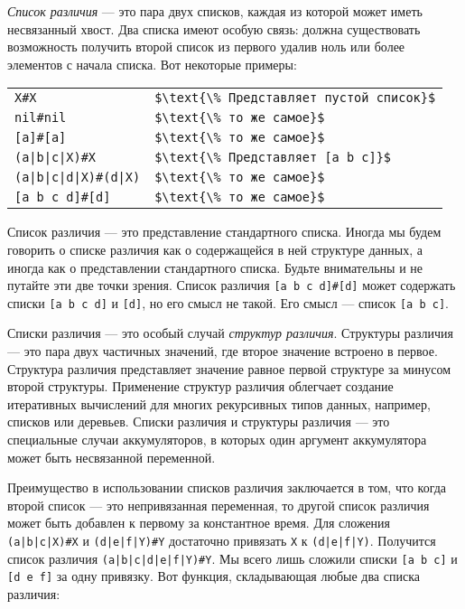 \emph{Список различия} --- это пара двух списков, каждая из которой может иметь несвязанный хвост. Два списка имеют особую связь: должна существовать возможность получить второй список из первого удалив ноль или более элементов с начала списка. Вот некоторые примеры:

\begin{tabular}{ll}
  \lstinline!X#X! & \lstinline!$\text{\% Представляет пустой список}$! \\
  \lstinline!nil#nil! & \lstinline!$\text{\% то же самое}$! \\
  \lstinline![a]#[a]! & \lstinline!$\text{\% то же самое}$! \\
  \lstinline!(a|b|c|X)#X! & \lstinline!$\text{\% Представляет [a b c]}$! \\
  \lstinline!(a|b|c|d|X)#(d|X)! & \lstinline!$\text{\% то же самое}$! \\
  \lstinline![a b c d]#[d]! & \lstinline!$\text{\% то же самое}$! \\
\end{tabular}

Список различия --- это представление стандартного списка. Иногда мы будем говорить о списке различия как о содержащейся в ней структуре данных, а иногда как о представлении стандартного списка. Будьте внимательны и не путайте эти две точки зрения. Список различия \lstinline|[a b c d]#[d]| может содержать списки \lstinline![a b c d]! и \lstinline![d]!, но его смысл не такой. Его смысл --- список \lstinline![a b c]!.

Списки различия --- это особый случай \emph{структур различия}. Структуры различия --- это пара двух частичных значений, где второе значение встроено в первое. Структура различия представляет значение равное первой структуре за минусом второй структуры. Применение структур различия облегчает создание итеративных вычислений для многих рекурсивных типов данных, например, списков или деревьев. Списки различия и структуры различия --- это специальные случаи аккумуляторов, в которых один аргумент аккумулятора может быть несвязанной переменной.

Преимущество в использовании списков различия заключается в том, что когда второй список --- это непривязанная переменная, то другой список различия может быть добавлен к первому за константное время. Для сложения \lstinline!(a|b|c|X)#X! и \lstinline!(d|e|f|Y)#Y! достаточно привязать \lstinline!X! к \lstinline!(d|e|f|Y)!. Получится список различия \lstinline!(a|b|c|d|e|f|Y)#Y!. Мы всего лишь сложили списки \lstinline![a b c]! и \lstinline![d e f]! за одну привязку. Вот функция, складывающая любые два списка различия:

